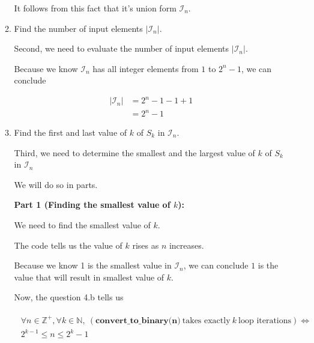 \documentclass[12pt]{article}
\begin{document}
\begin{enumerate}[a.]
\begin{mdframed}
\begin{enumerate}[1.]
\begin{mdframed}
            \bigskip

            It follows from this fact that it's union form $\mathcal{I}_n$.
        \end{mdframed}

        \item Find the number of input elements $\lvert \mathcal{I}_n \rvert$.

        \begin{mdframed}
        Second, we need to evaluate the number of input elements $\lvert \mathcal{I}_n \rvert$.

        \bigskip

        Because we know $\mathcal{I}_n$ has all integer elements from $1$ to $2^n - 1$,
        we can conclude

        \begin{align}
            \lvert \mathcal{I}_n \rvert &= 2^n - 1 - 1 + 1\\
            &= 2^n - 1
        \end{align}
        \end{mdframed}

        \item Find the first and last value of $k$ of $S_k$ in $\mathcal{I}_n$.

        \begin{mdframed}
        Third, we need to determine the smallest and the largest value of $k$
        of $S_k$ in $\mathcal{I}_n$

        \bigskip

        We will do so in parts.

        \bigskip

        \textbf{Part 1 (Finding the smallest value of $k$):}

        \bigskip

        We need to find the smallest value of $k$.

        \bigskip

        The code tells us the value of $k$ rises as $n$ increases.

        \bigskip

        Because we know 1 is the smallest value in $\mathcal{I}_n$, we can conclude
        $1$ is the value that will result in smallest value of $k$.

        \bigskip

        Now, the question 4.b tells us

        \begin{align}
            \begin{split}
            \forall n \in \mathbb{Z}^+, \forall k \in \mathbb{N},\: (\textbf{
            convert\_to\_binary(n)}\:\text{takes exactly}\:k\:\text{loop iterations}) \Leftrightarrow
            \\ 2^{k-1} \leq n \leq 2^k -1
            \end{split}
        \end{align}


\end{mdframed}
\end{enumerate}
\end{mdframed}
\end{enumerate}
\end{document}
